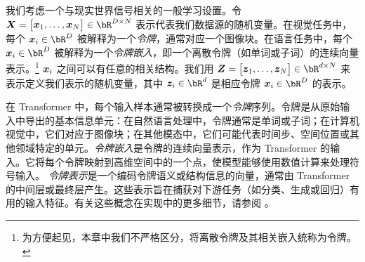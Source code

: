 \documentclass[../../book-main.tex]{subfiles}
\begin{document}
我们考虑一个与现实世界信号相关的一般学习设置。令 \(\X = \mat{\x_{1}, \dots, \x_{N}} \in \bR^{D \times N}\) 表示代表我们数据源的随机变量。在视觉任务中，每个 \(\x_{i} \in \bR^{D}\) 被解释为一个\textit{令牌}，通常对应一个图像块。在语言任务中，每个 \(\x_{i} \in \bR^{D}\) 被解释为一个\textit{令牌嵌入}，即一个离散令牌（如单词或子词）的连续向量表示。\footnote{为方便起见，本章中我们不严格区分，将离散令牌及其相关嵌入统称为令牌。} %
\(\bm{x}_{i}\) 之间可以有任意的相关结构。我们用 \(\Z = \mat{\z_{1}, \dots, \z_{N}} \in \bR^{d \times N}\) 来表示定义我们表示的随机变量，其中 \(\z_{i} \in \bR^{d}\) 是相应令牌 \(\x_i \in \bR^{D}\) 的表示。%

\begin{remark}
    在 Transformer 中，每个输入样本通常被转换成一个{\em 令牌}序列。令牌是从原始输入中导出的基本信息单元：在自然语言处理中，令牌通常是单词或子词；在计算机视觉中，它们对应于图像块；在其他模态中，它们可能代表时间步、空间位置或其他领域特定的单元。{\em 令牌嵌入}是令牌的连续向量表示，作为 Transformer 的输入。它将每个令牌映射到高维空间中的一个点，使模型能够使用数值计算来处理符号输入。
    {\em 令牌表示}是一个编码令牌语义或结构信息的向量，通常由 Transformer 的中间层或最终层产生。这些表示旨在捕获对下游任务（如分类、生成或回归）有用的输入特征。有关这些概念在实现中的更多细节，请参阅 。
\end{remark}


\end{document}
